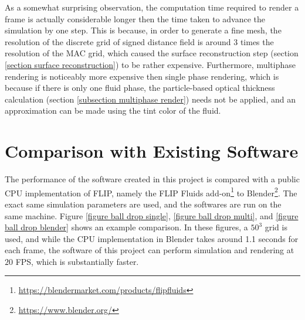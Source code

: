 As a somewhat surprising observation, the computation time required to render a frame is actually considerable longer then the time taken to advance the simulation by one step. This is because, in order to generate a fine mesh, the resolution of the discrete grid of signed distance field is around 3 times the resolution of the MAC grid, which caused the surface reconstruction step (section \ref{section surface reconstruction}) to be rather expensive. Furthermore, multiphase rendering is noticeably more expensive then single phase rendering, which is because if there is only one fluid phase, the particle-based optical thickness calculation (section \ref{subsection multiphase render}) needs not be applied, and an approximation can be made using the tint color of the fluid.

\section{Comparison with Existing Software}

The performance of the software created in this project is compared with a public CPU implementation of FLIP, namely the FLIP Fluids add-on\footnote{\url{https://blendermarket.com/products/flipfluids}} to Blender\footnote{\url{https://www.blender.org/}}. The exact same simulation parameters are used, and the softwares are run on the same machine. Figure \ref{figure ball drop single}, \ref{figure ball drop multi}, and \ref{figure ball drop blender} shows an example comparison. In these figures, a $50^3$ grid is used, and while the CPU implementation in Blender takes around 1.1 seconds for each frame, the software of this project can perform simulation and rendering at $20$ FPS, which is substantially faster.

\gapM
\gapM
\gapM


